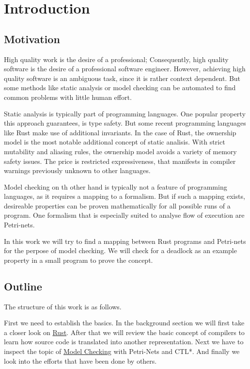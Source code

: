 \chapter{Introduction}
\label{introduction}
\section{Motivation}
High quality work is the desire of a professional;
Consequently, high quality software is the desire of a professional software engineer.
However, achieving high quality software is an ambiguous task, since it is rather context dependent.
But some methods like static analysis or model checking can be automated to find common problems with little human effort.

Static analysis is typically part of programming languages.
One popular property this approach guarantees, is type safety.
But some recent programming languages like Rust\cite{Matsakis:2014:RL:2692956.2663188} make use of additional invariants.
In the case of Rust, the ownership model is the most notable additional concept of static analisis.
With strict mutability and aliasing rules, the ownership model avoids a variety of memory safety issues.
The price is restricted expressiveness, that manifests in compiler warnings previously unknown to other languages.

Model checking on th other hand is typically not a feature of programming languages, as it requires a mapping to a formalism.
But if such a mapping exists, desireable properties can be proven mathematically for all possible runs of a program.
One formalism that is especially suited to analyse flow of execution are Petri-nets.

In this work we will try to find a mapping between Rust programs and Petri-nets for the perpose of model checking.
We will check for a deadlock as an example property in a small program to prove the concept.

\section{Outline}
The structure of this work is as follows.

First we need to establish the basics.
In the background section we will first take a closer look on \hyperlink{rel_rust}{Rust}.
After that we will review the basic concept of compilers to learn how source code is translated into another representation.
Next we have to inspect the topic of \hyperlink{rel_mc}{Model Checking} with Petri-Nets and CTL*.
And finally we look into the efforts that have been done by others.

